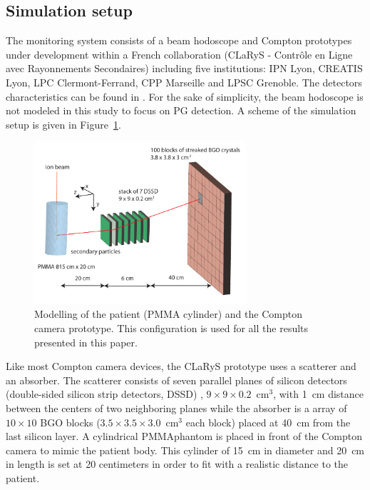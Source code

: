 \documentclass[11pt]{iopart}
\begin{document}
\subsection{Simulation setup}

The monitoring system consists of a beam hodoscope and Compton prototypes under development within a French collaboration (CLaRyS - Contr\^ole en Ligne avec Rayonnements Secondaires) including five institutions: IPN Lyon, CREATIS Lyon, LPC Clermont-Ferrand, CPP Marseille and LPSC Grenoble. The detectors characteristics can be found in \cite{Krimmer2015}. For the sake of simplicity, the beam hodoscope is not modeled in this study to focus on PG detection. A scheme of the simulation setup is given in Figure~\ref{fig:fig_setup_CC_simulation_Hadronth}.

\begin{figure} [!hbtp]	
  \centering
  \includegraphics[width=0.7\textwidth]{./Figure/Compton_Camera_hadontherapy_PMMA_Cylinder_EN.pdf}
	  \caption{Modelling of the patient (PMMA cylinder) and the Compton camera prototype. This configuration is used for all the results presented in this paper.}
  \label{fig:fig_setup_CC_simulation_Hadronth}
\end{figure}

Like most Compton camera devices, the CLaRyS prototype uses a scatterer and an absorber. The scatterer consists of seven parallel planes of silicon detectors (double-sided silicon strip detectors, DSSD) , $9\times9\times0.2$~cm$^3$, with 1~cm distance between the centers of two neighboring planes while the absorber is a array of $10\times10$ BGO blocks ($3.5\times3.5\times3.0$~cm$^3$ each block) placed at 40~cm from the last silicon layer. A cylindrical PMMA\footnotemark[1] phantom is placed in front of the Compton camera to mimic the patient body. This cylinder of 15~cm in diameter and 20~cm in length is set at 20 centimeters in order to fit with a realistic distance to the patient.
\end{document}
